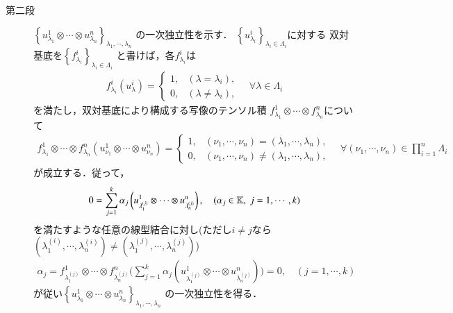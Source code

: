 \begin{prf}
\begin{description}
			\item[第二段]
				$\left\{ u^1_{\lambda_1} \otimes 
				\cdots \otimes u^n_{\lambda_n} \right\}_{\lambda_1,\cdots,\lambda_n}$
				の一次独立性を示す．
				$\left\{ u^i_{\lambda_i} \right\}_{\lambda_i \in \Lambda_i}$に対する
				双対基底を$\left\{ f^i_{\lambda_i} \right\}_{\lambda_i \in \Lambda_i}$
				と書けば，各$f^i_{\lambda_i}$は
				\begin{align}
					f^i_{\lambda_i}(u^i_\lambda) =
					\begin{cases}
						1, & (\lambda = \lambda_i), \\
						0, & (\lambda \neq \lambda_i),
					\end{cases}
					\quad \forall \lambda \in \Lambda_i
				\end{align}
				を満たし，双対基底により構成する写像のテンソル積
				$f^1_{\lambda_1} \otimes \cdots \otimes f^n_{\lambda_n}$について
				\begin{align}
					f^1_{\lambda_1} \otimes \cdots \otimes f^n_{\lambda_n}(u^1_{\nu_1} \otimes 
					\cdots \otimes u^n_{\nu_n}) = 
					\begin{cases}
						1, & (\nu_1,\cdots,\nu_n) = (\lambda_1,\cdots,\lambda_n), \\
						0, & (\nu_1,\cdots,\nu_n) \neq (\lambda_1,\cdots,\lambda_n),
					\end{cases}
					\quad \forall (\nu_1,\cdots,\nu_n) \in \prod_{i=1}^n \Lambda_i
				\end{align}
				が成立する．従って，
				\begin{align}
					0 = \sum_{j=1}^k \alpha_j \left(u^1_{\lambda^{(j)}_1} \otimes 
					\cdots \otimes u^n_{\lambda^{(j)}_n} \right),
					\quad (\alpha_j \in \mathbb{K},\ j=1,\cdots,k)
				\end{align}
				を満たすような任意の線型結合に対し(ただし$i \neq j$なら$(\lambda_1^{(i)},\cdots,\lambda_n^{(i)}) \neq (\lambda_1^{(j)},\cdots,\lambda_n^{(j)})$)
				\begin{align}
					\alpha_j = f^1_{\lambda^{(j)}_1} \otimes \cdots \otimes f^n_{\lambda^{(j)}_n}
					\biggl( \sum_{j=1}^k \alpha_j \left(u^1_{\lambda^{(j)}_1} \otimes 
					\cdots \otimes u^n_{\lambda^{(j)}_n} \right) \biggr)
					= 0,
					\quad (j=1,\cdots,k)
				\end{align}
				が従い$\left\{ u^1_{\lambda_1} \otimes 
				\cdots \otimes u^n_{\lambda_n} \right\}_{\lambda_1,\cdots,\lambda_n}$
				の一次独立性を得る．
				\QED
		\end{description}
	\end{prf}
	
